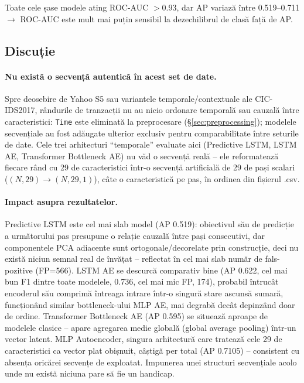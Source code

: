 Toate cele șase modele ating ROC-AUC $>0.93$, dar AP variază între 0.519--0.711 $\to$ ROC-AUC este mult mai puțin sensibil la dezechilibrul de clasă față de AP.

\subsection{Discuție}

\paragraph{Nu există o secvență autentică în acest set de date.} Spre deosebire de Yahoo S5 sau variantele temporale/contextuale ale CIC-IDS2017, rândurile de tranzacții nu au nicio ordonare temporală sau cauzală între caracteristici: \texttt{Time} este eliminată la preprocesare (\S\ref{sec:preprocessing}); modelele secvențiale au fost adăugate ulterior exclusiv pentru comparabilitate între seturile de date.
Cele trei arhitecturi \enquote{temporale} evaluate aici (Predictive LSTM, LSTM AE, Transformer Bottleneck AE) nu văd o secvență reală -- ele reformatează fiecare rând cu 29 de caracteristici într-o secvență artificială de 29 de pași scalari ($(N,29) \to (N,29,1)$), câte o caracteristică pe pas, în ordinea din fișierul .csv.

\paragraph{Impact asupra rezultatelor.} Predictive LSTM este cel mai slab model (AP 0.519): obiectivul său de predicție a următorului pas presupune o relație cauzală între pași consecutivi, dar componentele PCA adiacente sunt ortogonale/decorelate prin construcție, deci nu există niciun semnal real de învățat -- reflectat în cel mai slab număr de fals-pozitive (FP=566).
LSTM AE se descurcă comparativ bine (AP 0.622, cel mai bun F1 dintre toate modelele, 0.736, cel mai mic FP, 174), probabil întrucât encoderul său comprimă întreaga intrare într-o singură stare ascunsă sumară, funcționând similar bottleneck-ului MLP AE, mai degrabă decât depinzând doar de ordine.
Transformer Bottleneck AE (AP 0.595) se situează aproape de modelele clasice -- apare agregarea medie globală (global average pooling) într-un vector latent.
MLP Autoencoder, singura arhitectură care tratează cele 29 de caracteristici ca vector plat obișnuit, câștigă per total (AP 0.7105) -- consistent cu absența oricărei secvențe de exploatat. Impunerea unei structuri secvențiale acolo unde nu există niciuna pare să fie un handicap.

